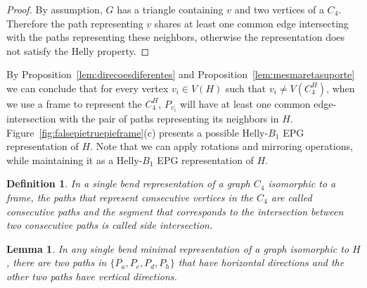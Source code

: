 \documentclass[
submission
]{dmtcs-episciences}
\newtheorem{lemma}[theorem]{Lemma}
\newtheorem{definition}[theorem]{Definition}
\begin{document}

\begin{proof}
By assumption, $G$ has a triangle containing $v$ and two vertices of a $C_4$. Therefore the path representing $v$ shares at least one common edge intersecting with the paths representing these neighbors, otherwise the representation does not satisfy the Helly property.
 \end{proof}


By Proposition~\ref{lem:direcoesdiferentes} and Proposition~\ref{lem:mesmaretasuporte} we can conclude that for every vertex $v_i \in V(H)$ such that $v_i \neq V(C_4^{H})$, when we use a frame to represent the $C_4^{H}$, $P_{v_i}$ will have at least one common edge-intersection with the pair of paths representing its neighbors in $H$. 
Figure~\ref{fig:falsepietruepieframe}(c) presents a possible Helly-$B_1$ EPG representation of $H$. 
Note that we can apply rotations and mirroring operations, while maintaining it as a Helly-$B_1$ EPG representation of $H$.

\begin{definition}
In a single bend representation of a graph $C_4$ isomorphic to a frame, the paths that represent consecutive vertices in the $C_4$ are called \emph{con\-se\-cu\-ti\-ve paths} and the segment that corresponds to the intersection between two consecutive paths is called \emph{side intersection}.  
\end{definition}

\begin{lemma}\label{lem:2vertical2horizontal}
In any single bend minimal representation of a graph isomorphic to $H$, there are two paths in $\{P_a, P_e, P_{d}, P_{h} \}$ that have horizontal directions and the other two paths have vertical directions.
\end{lemma}
\end{document}
